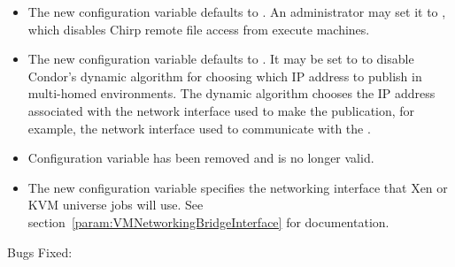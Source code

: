 \begin{itemize}

\item The new configuration variable  
defaults to . 
An administrator may set it to , which 
disables Chirp remote file access from execute machines.

\item The new configuration variable
   defaults to .  It may
  be set to  to disable Condor's dynamic algorithm for choosing
  which IP address to publish in multi-homed environments.  The dynamic
  algorithm chooses the IP address associated with the network interface
  used to make the publication, for example, the network interface used 
  to communicate with the .

\item Configuration variable  has been removed
  and is no longer valid.

\item The new configuration variable
   specifies the networking interface
  that Xen or KVM  universe jobs will use.
  See section~\ref{param:VMNetworkingBridgeInterface} for documentation.

\end{itemize}

\noindent Bugs Fixed:

